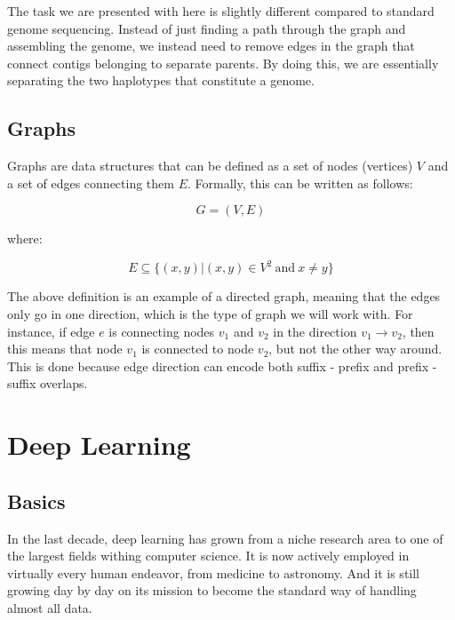 \documentclass[times, utf8, diplomski, english]{fer_eng}
\begin{document}
The task we are presented with here is slightly different compared to standard genome sequencing. Instead of just finding a path through the graph and assembling the genome, we instead need to remove edges in the graph that connect contigs belonging to separate parents. By doing this, we are essentially separating the two haplotypes that constitute a genome.

\subsection{Graphs}

Graphs are data structures that can be defined as a set of nodes (vertices) $V$ and a set of edges connecting them $E$. Formally, this can be written as follows:

\[ G = (V, E) \]

where:

\[ E \subseteq 	\{ (x, y)|(x, y) \in V^2 \mathrm{\ and\ } x \neq y \} \]

The above definition is an example of a directed graph, meaning that the edges only go in one direction, which is the type of graph we will work with. For instance, if edge $e$ is connecting nodes $v_1$ and $v_2$ in the direction $v_1 \rightarrow v_2$, then this means that node $v_1$ is connected to node $v_2$, but not the other way around. This is done because edge direction can encode both suffix - prefix and prefix - suffix overlaps.

\section{Deep Learning}

\subsection{Basics}

In the last decade, deep learning has grown from a niche research area to one of the largest fields withing computer science. It is now actively employed in virtually every human endeavor, from medicine to astronomy. And it is still growing day by day on its mission to become the standard way of handling almost all data.
\end{document}
